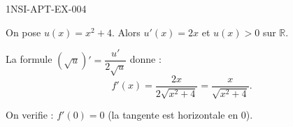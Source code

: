 \begin{corrige}{1NSI-APT-EX-004}

On pose $u(x) = x^2+4$. Alors $u'(x) = 2x$ et $u(x) > 0$ sur $\mathbb{R}$.


La formule $(\sqrt{u})' = \dfrac{u'}{2\sqrt{u}}$ donne :
\[ f'(x) = \frac{2x}{2\sqrt{x^2+4}} = \frac{x}{\sqrt{x^2+4}}. \]

On verifie : $f'(0) = 0$ (la tangente est horizontale en $0$).

\end{corrige}
